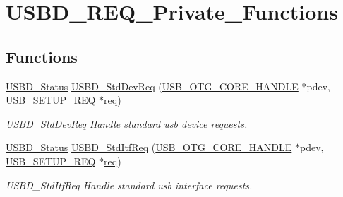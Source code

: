 \hypertarget{group___u_s_b_d___r_e_q___private___functions}{\section{U\-S\-B\-D\-\_\-\-R\-E\-Q\-\_\-\-Private\-\_\-\-Functions}
\label{group___u_s_b_d___r_e_q___private___functions}
}
\subsection*{Functions}
\begin{DoxyCompactItemize}
\item 
\hyperlink{group___u_s_b_d___c_o_r_e___exported___defines_ga1c59ec10075b576176aa51c9ef4e9fc4}{U\-S\-B\-D\-\_\-\-Status} \hyperlink{group___u_s_b_d___r_e_q___private___functions_ga8ffadad0364221ad24569053d0579bf8}{U\-S\-B\-D\-\_\-\-Std\-Dev\-Req} (\hyperlink{group___u_s_b___c_o_r_e___exported___types_gaf76054c11eb8a3367907aad7ae700e80}{U\-S\-B\-\_\-\-O\-T\-G\-\_\-\-C\-O\-R\-E\-\_\-\-H\-A\-N\-D\-L\-E} $\ast$pdev, \hyperlink{group___u_s_b___c_o_r_e___exported___types_gacd8d898c844c3657315c7d7a4ea3a99c}{U\-S\-B\-\_\-\-S\-E\-T\-U\-P\-\_\-\-R\-E\-Q} $\ast$\hyperlink{pios__opahrs__proto_8h_ad651fd9affe5ed0ac9abccd8e2791a2c}{req})
\begin{DoxyCompactList}\small\item\em U\-S\-B\-D\-\_\-\-Std\-Dev\-Req Handle standard usb device requests. \end{DoxyCompactList}\item 
\hyperlink{group___u_s_b_d___c_o_r_e___exported___defines_ga1c59ec10075b576176aa51c9ef4e9fc4}{U\-S\-B\-D\-\_\-\-Status} \hyperlink{group___u_s_b_d___r_e_q___private___functions_ga6092576a8408c8e638ead7fcb30b0dd1}{U\-S\-B\-D\-\_\-\-Std\-Itf\-Req} (\hyperlink{group___u_s_b___c_o_r_e___exported___types_gaf76054c11eb8a3367907aad7ae700e80}{U\-S\-B\-\_\-\-O\-T\-G\-\_\-\-C\-O\-R\-E\-\_\-\-H\-A\-N\-D\-L\-E} $\ast$pdev, \hyperlink{group___u_s_b___c_o_r_e___exported___types_gacd8d898c844c3657315c7d7a4ea3a99c}{U\-S\-B\-\_\-\-S\-E\-T\-U\-P\-\_\-\-R\-E\-Q} $\ast$\hyperlink{pios__opahrs__proto_8h_ad651fd9affe5ed0ac9abccd8e2791a2c}{req})
\begin{DoxyCompactList}\small\item\em U\-S\-B\-D\-\_\-\-Std\-Itf\-Req Handle standard usb interface requests. \end{DoxyCompactList}\item 

\end{DoxyCompactItemize}

